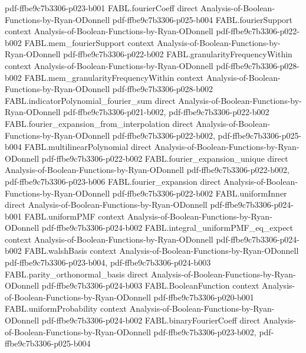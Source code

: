 \begin{theorem}
  {pdf-ffbe9c7b3306-p023-b001}
\proofstep
  {FABL.fourierCoeff}
  {direct}
  {Analysis-of-Boolean-Functions-by-Ryan-ODonnell}
  {pdf-ffbe9c7b3306-p025-b004}
\proofstep
  {FABL.fourierSupport}
  {context}
  {Analysis-of-Boolean-Functions-by-Ryan-ODonnell}
  {pdf-ffbe9c7b3306-p022-b002}
\proofstep
  {FABL.mem_fourierSupport}
  {context}
  {Analysis-of-Boolean-Functions-by-Ryan-ODonnell}
  {pdf-ffbe9c7b3306-p022-b002}
\proofstep
  {FABL.granularityFrequencyWithin}
  {context}
  {Analysis-of-Boolean-Functions-by-Ryan-ODonnell}
  {pdf-ffbe9c7b3306-p028-b002}
\proofstep
  {FABL.mem_granularityFrequencyWithin}
  {context}
  {Analysis-of-Boolean-Functions-by-Ryan-ODonnell}
  {pdf-ffbe9c7b3306-p028-b002}
\proofstep
  {FABL.indicatorPolynomial_fourier_sum}
  {direct}
  {Analysis-of-Boolean-Functions-by-Ryan-ODonnell}
  {pdf-ffbe9c7b3306-p021-b002,
    pdf-ffbe9c7b3306-p022-b002}
\proofstep
  {FABL.fourier_expansion_from_interpolation}
  {direct}
  {Analysis-of-Boolean-Functions-by-Ryan-ODonnell}
  {pdf-ffbe9c7b3306-p022-b002,
    pdf-ffbe9c7b3306-p025-b004}
\proofstep
  {FABL.multilinearPolynomial}
  {direct}
  {Analysis-of-Boolean-Functions-by-Ryan-ODonnell}
  {pdf-ffbe9c7b3306-p022-b002}
\proofstep
  {FABL.fourier_expansion_unique}
  {direct}
  {Analysis-of-Boolean-Functions-by-Ryan-ODonnell}
  {pdf-ffbe9c7b3306-p022-b002,
    pdf-ffbe9c7b3306-p023-b006}
\proofstep
  {FABL.fourier_expansion}
  {direct}
  {Analysis-of-Boolean-Functions-by-Ryan-ODonnell}
  {pdf-ffbe9c7b3306-p022-b002}
\proofstep
  {FABL.uniformInner}
  {direct}
  {Analysis-of-Boolean-Functions-by-Ryan-ODonnell}
  {pdf-ffbe9c7b3306-p024-b001}
\proofstep
  {FABL.uniformPMF}
  {context}
  {Analysis-of-Boolean-Functions-by-Ryan-ODonnell}
  {pdf-ffbe9c7b3306-p024-b002}
\proofstep
  {FABL.integral_uniformPMF_eq_expect}
  {context}
  {Analysis-of-Boolean-Functions-by-Ryan-ODonnell}
  {pdf-ffbe9c7b3306-p024-b002}
\proofstep
  {FABL.walshBasis}
  {context}
  {Analysis-of-Boolean-Functions-by-Ryan-ODonnell}
  {pdf-ffbe9c7b3306-p023-b004,
    pdf-ffbe9c7b3306-p024-b003}
\proofstep
  {FABL.parity_orthonormal_basis}
  {direct}
  {Analysis-of-Boolean-Functions-by-Ryan-ODonnell}
  {pdf-ffbe9c7b3306-p024-b003}
\proofstep
  {FABL.BooleanFunction}
  {context}
  {Analysis-of-Boolean-Functions-by-Ryan-ODonnell}
  {pdf-ffbe9c7b3306-p020-b001}
\proofstep
  {FABL.uniformProbability}
  {context}
  {Analysis-of-Boolean-Functions-by-Ryan-ODonnell}
  {pdf-ffbe9c7b3306-p024-b002}
\proofstep
  {FABL.binaryFourierCoeff}
  {direct}
  {Analysis-of-Boolean-Functions-by-Ryan-ODonnell}
  {pdf-ffbe9c7b3306-p023-b002,
    pdf-ffbe9c7b3306-p025-b004}

\end{theorem}
